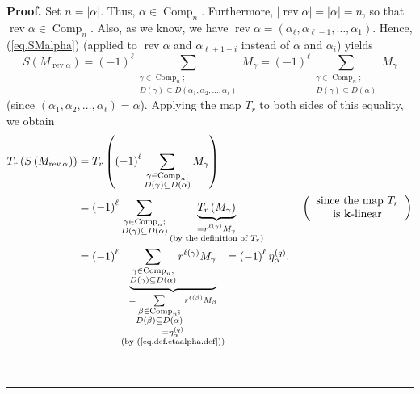 \documentclass[numbers=enddot,12pt,final,onecolumn,notitlepage]{scrartcl}%
\theoremstyle{definition}
\newenvironment{proof}[1][Proof]{\noindent\textbf{#1.} }{\ \rule{0.5em}{0.5em}}
\let\sumnonlimits\sum
\renewcommand{\sum}{\sumnonlimits\limits}
\newenvironment{verlong}{}{}
\begin{document}
\begin{proof}
\begin{verlong}
Set $n=\left\vert \alpha\right\vert $. Thus, $\alpha\in\operatorname*{Comp}%
\nolimits_{n}$. Furthermore, $\left\vert \operatorname*{rev}\alpha\right\vert
=\left\vert \alpha\right\vert =n$, so that $\operatorname*{rev}\alpha
\in\operatorname*{Comp}\nolimits_{n}$. Also, as we know, we have
$\operatorname*{rev}\alpha=\left(  \alpha_{\ell},\alpha_{\ell-1},\ldots
,\alpha_{1}\right)  $. Hence, (\ref{eq.SMalpha}) (applied to
$\operatorname*{rev}\alpha$ and $\alpha_{\ell+1-i}$ instead of $\alpha$ and
$\alpha_{i}$) yields%
\[
S\left(  M_{\operatorname*{rev}\alpha}\right)  =\left(  -1\right)  ^{\ell}%
\sum_{\substack{\gamma\in\operatorname*{Comp}\nolimits_{n};\\D\left(
\gamma\right)  \subseteq D\left(  \alpha_{1},\alpha_{2},\ldots,\alpha_{\ell
}\right)  }}M_{\gamma}=\left(  -1\right)  ^{\ell}\sum_{\substack{\gamma
\in\operatorname*{Comp}\nolimits_{n};\\D\left(  \gamma\right)  \subseteq
D\left(  \alpha\right)  }}M_{\gamma}%
\]
(since $\left(  \alpha_{1},\alpha_{2},\ldots,\alpha_{\ell}\right)  =\alpha$).
Applying the map $T_{r}$ to both sides of this equality, we obtain%
\begin{align*}
T_{r}\left(  S\left(  M_{\operatorname*{rev}\alpha}\right)  \right)   &
=T_{r}\left(  \left(  -1\right)  ^{\ell}\sum_{\substack{\gamma\in
\operatorname*{Comp}\nolimits_{n};\\D\left(  \gamma\right)  \subseteq D\left(
\alpha\right)  }}M_{\gamma}\right) \\
&  =\left(  -1\right)  ^{\ell}\sum_{\substack{\gamma\in\operatorname*{Comp}%
\nolimits_{n};\\D\left(  \gamma\right)  \subseteq D\left(  \alpha\right)
}}\underbrace{T_{r}\left(  M_{\gamma}\right)  }_{\substack{=r^{\ell\left(
\gamma\right)  }M_{\gamma}\\\text{(by the definition of }T_{r}\text{)}%
}}\ \ \ \ \ \ \ \ \ \ \left(
\begin{array}
[c]{c}%
\text{since the map }T_{r}\\
\text{is }\mathbf{k}\text{-linear}%
\end{array}
\right) \\
&  =\left(  -1\right)  ^{\ell}\underbrace{\sum_{\substack{\gamma
\in\operatorname*{Comp}\nolimits_{n};\\D\left(  \gamma\right)  \subseteq
D\left(  \alpha\right)  }}r^{\ell\left(  \gamma\right)  }M_{\gamma}%
}_{\substack{=\sum_{\substack{\beta\in\operatorname*{Comp}\nolimits_{n}%
;\\D\left(  \beta\right)  \subseteq D\left(  \alpha\right)  }}r^{\ell\left(
\beta\right)  }M_{\beta}\\=\eta_{\alpha}^{\left(  q\right)  }\\\text{(by
(\ref{eq.def.etaalpha.def}))}}}=\left(  -1\right)  ^{\ell}\eta_{\alpha
}^{\left(  q\right)  }.
\end{align*}


\end{verlong}
\end{proof}
\end{document}
